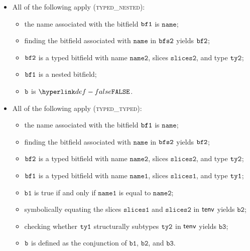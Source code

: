 \documentclass{book}
\newcommand\vbone[0]{\texttt{b1}}
\newcommand\vbtwo[0]{\texttt{b2}}
\newcommand\vbthree[0]{\texttt{b3}}
\newcommand\nameone[0]{\texttt{name1}}
\newcommand\nametwo[0]{\texttt{name2}}
\newcommand\slicesone[0]{\texttt{slices1}}
\newcommand\slicestwo[0]{\texttt{slices2}}
\newcommand\name[0]{\texttt{name}}
\begin{document}
\begin{itemize}
  \item All of the following apply (\textsc{typed\_nested}):
  \begin{itemize}
    \item the name associated with the bitfield $\texttt{bf1}$ is $\name$;
    \item finding the bitfield associated with $\name$ in $\texttt{bfs2}$ yields $\texttt{bf2}$;
    \item $\texttt{bf2}$ is a typed bitfield with name $\nametwo$, slices $\slicestwo$, and type $\texttt{ty2}$;
    \item $\texttt{bf1}$ is a nested bitfield;
    \item $\texttt{b}$ is $\False$.
  \end{itemize}

  \item All of the following apply (\textsc{typed\_typed}):
  \begin{itemize}
    \item the name associated with the bitfield $\texttt{bf1}$ is $\name$;
    \item finding the bitfield associated with $\name$ in $\texttt{bfs2}$ yields $\texttt{bf2}$;
    \item $\texttt{bf2}$ is a typed bitfield with name $\nametwo$, slices $\slicestwo$, and type $\texttt{ty2}$;
    \item $\texttt{bf1}$ is a typed bitfield with name $\nameone$, slices $\slicesone$, and type $\texttt{ty1}$;
    \item $\vbone$ is true if and only if $\nameone$ is equal to $\nametwo$;
    \item symbolically equating the slices $\slicesone$ and $\slicestwo$ in $\textsf{tenv}$ yields $\vbtwo$;
    \item checking whether $\texttt{ty1}$ structurally subtypes $\texttt{ty2}$ in $\textsf{tenv}$ yields $\vbthree$;
    \item $\texttt{b}$ is defined as the conjunction of $\vbone$, $\vbtwo$, and $\vbthree$.
  \end{itemize}
\end{itemize}
\end{document}
